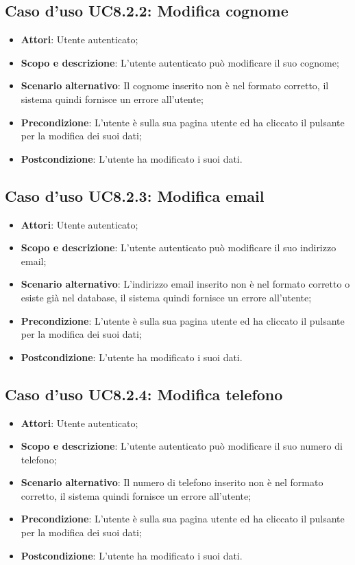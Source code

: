 \documentclass[12pt,a4paper,titlepage]{article}
\begin{document}
	\subsection{Caso d'uso UC8.2.2: Modifica cognome}
	\label{UC8.2.2}
	\begin{itemize}
		\item \textbf{Attori}: Utente autenticato;
		\item \textbf{Scopo e descrizione}: L'utente autenticato può modificare il suo cognome;
		\item \textbf{Scenario alternativo}: Il cognome inserito non è nel formato corretto, il sistema quindi fornisce un errore all'utente;
		\item \textbf{Precondizione}: L'utente è sulla sua pagina utente ed ha cliccato il pulsante per la modifica dei suoi dati;
		\item \textbf{Postcondizione}: L'utente ha modificato i suoi dati.
	\end{itemize}
	\subsection{Caso d'uso UC8.2.3: Modifica email}
	\label{UC8.2.3}
	\begin{itemize}
		\item \textbf{Attori}: Utente autenticato;
		\item \textbf{Scopo e descrizione}: L'utente autenticato può modificare il suo indirizzo email;
		\item \textbf{Scenario alternativo}: L'indirizzo email inserito non è nel formato corretto o esiste già nel database, il sistema quindi fornisce un errore all'utente;
		\item \textbf{Precondizione}: L'utente è sulla sua pagina utente ed ha cliccato il pulsante per la modifica dei suoi dati;
		\item \textbf{Postcondizione}: L'utente ha modificato i suoi dati.
	\end{itemize}
	\subsection{Caso d'uso UC8.2.4: Modifica telefono}
	\label{UC8.2.4}
	\begin{itemize}
		\item \textbf{Attori}: Utente autenticato;
		\item \textbf{Scopo e descrizione}: L'utente autenticato può modificare il suo numero di telefono;
		\item \textbf{Scenario alternativo}: Il numero di telefono inserito non è nel formato corretto, il sistema quindi fornisce un errore all'utente;
		\item \textbf{Precondizione}: L'utente è sulla sua pagina utente ed ha cliccato il pulsante per la modifica dei suoi dati;
		\item \textbf{Postcondizione}: L'utente ha modificato i suoi dati.
	\end{itemize}
\end{document}
